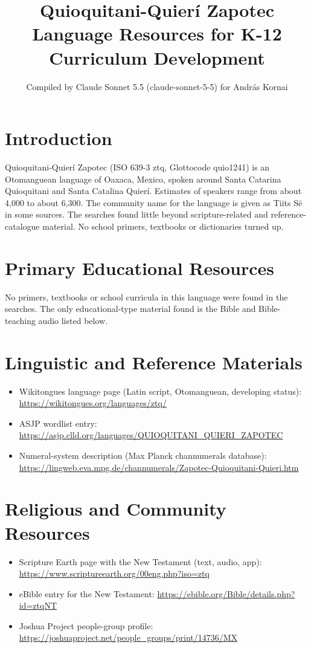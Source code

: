 \documentclass[12pt]{article}
\title{Quioquitani-Quier\'i Zapotec Language Resources for K-12 Curriculum Development}
\author{Compiled by Claude Sonnet 5.5 (claude-sonnet-5-5) for Andr\'as Kornai}
\date{}
\begin{document}
\maketitle

\section{Introduction}
Quioquitani-Quier\'i Zapotec (ISO 639-3 ztq, Glottocode quio1241) is an Otomanguean language of Oaxaca, Mexico, spoken around Santa Catarina Quioquitani and Santa Catalina Quier\'i. Estimates of speakers range from about 4,000 to about 6,300. The community name for the language is given as Tiits S\"e in some sources. The searches found little beyond scripture-related and reference-catalogue material. No school primers, textbooks or dictionaries turned up.

\section{Primary Educational Resources}
No primers, textbooks or school curricula in this language were found in the searches. The only educational-type material found is the Bible and Bible-teaching audio listed below.

\section{Linguistic and Reference Materials}
\begin{itemize}
\item Wikitongues language page (Latin script, Otomanguean, developing status): \url{https://wikitongues.org/languages/ztq/}
\item ASJP wordlist entry: \url{https://asjp.clld.org/languages/QUIOQUITANI_QUIERI_ZAPOTEC}
\item Numeral-system description (Max Planck channumerals database): \url{https://lingweb.eva.mpg.de/channumerals/Zapotec-Quioquitani-Quieri.htm}
\end{itemize}

\section{Religious and Community Resources}
\begin{itemize}
\item Scripture Earth page with the New Testament (text, audio, app): \url{https://www.scriptureearth.org/00eng.php?iso=ztq}
\item eBible entry for the New Testament: \url{https://ebible.org/Bible/details.php?id=ztqNT}
\item Joshua Project people-group profile: \url{https://joshuaproject.net/people_groups/print/14736/MX}
\end{itemize}
\end{document}
